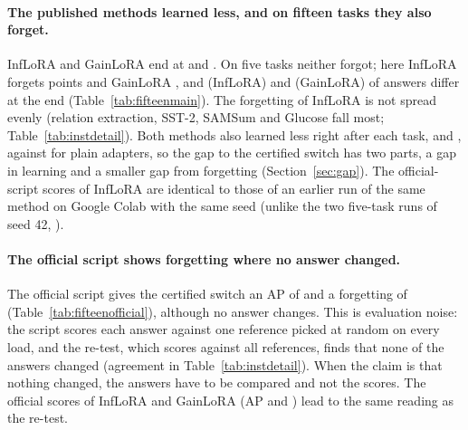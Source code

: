 \paragraph{The published methods learned less, and on fifteen tasks they also forget.} InfLoRA and
GainLoRA end at \FifteenInfAP{} and \FifteenGainAP{}. On five tasks
neither forgot; here InfLoRA forgets \FifteenInfFT{} points and GainLoRA \FifteenGainFT{}, and
\FifteenInfChanged{} (InfLoRA) and \FifteenGainChanged{} (GainLoRA) of \FifteenInfCompared{} answers differ at the end (Table~\ref{tab:fifteenmain}). The forgetting of InfLoRA is not
spread evenly (relation extraction, SST-2, SAMSum and Glucose fall most; Table~\ref{tab:instdetail}). Both
methods also learned less right after each task, \FifteenInfLearned{} and \FifteenGainLearned{}, against
\FifteenPlainLearned{} for plain adapters, so the gap to the
certified switch has two parts, a gap in learning and a smaller gap from forgetting (Section~\ref{sec:gap}). The official-script scores of InfLoRA are identical to those of an earlier run of the same method on Google Colab with the same seed (unlike the two five-task runs of seed 42, \fivefull{}).

\paragraph{The official script shows forgetting where no answer changed.} The official script gives
the certified switch an AP of \FifteenCertOffAP{} and a forgetting of \FifteenCertOffFT{}
(Table~\ref{tab:fifteenofficial}), although no answer changes. This is evaluation noise: the script scores each answer against one reference picked at random
on every load, and the re-test, which scores against all references, finds that none of the answers changed (agreement in Table~\ref{tab:instdetail}). When the claim is that nothing changed, the answers have to be
compared and not the scores. The official scores of InfLoRA and GainLoRA (AP \FifteenInfOffAP{} and \FifteenGainOffAP{}) lead to the same reading as
the re-test.

\begin{table}[t]
  \caption{Fifteen-task sequence with the original and with reworded instructions. The five tasks
  with rewordings sit inside the 15-task sequence. AP is the average score of these five tasks after the last task; ``Answers changed'' counts
  test inputs of the first four of them (of 400), and in the column ``original'' those of the first 14 tasks of the whole sequence (of 1{,}097). The adapters are those of Table~\ref{tab:fifteenmain};
  nothing is retrained.}
  \label{tab:fifteenwordings}
  \centering
  \small
  \setlength{\tabcolsep}{3.5pt}
  
\end{table}

